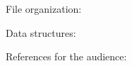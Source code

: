 \documentclass[12pt]{beamer}
\begin{document}
\begin{frame}
    File organization: \cite{folkzoellick1992}

    Data structures: \cite{langsam1990}

\end{frame}


\begin{frame}
    References for the audience:


    \printbibliography

\end{frame}
\end{document}
